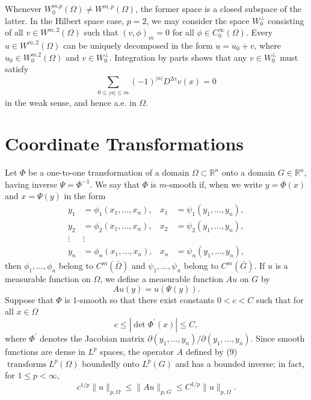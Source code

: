\begin{para}
  Whenever $W_0^{m . p}(\Omega) \neq W^{m, p}(\Omega)$, the former space is a closed subspace of the latter. In the Hilbert space case, $p=2$, we may consider the space $W_0^{\perp}$ consisting of all $v \in W^{m, 2}(\Omega)$ such that $(v, \phi)_m=0$ for all $\phi \in C_0^{\infty}(\Omega)$. Every $u \in W^{m, 2}(\Omega)$ can be uniquely decomposed in the form $u=u_0+v$, where $u_0 \in W_0^{m .2}(\Omega)$ and $v \in W_0^{\perp}$. Integration by parts shows that any $v \in W_0^{\perp}$ must satisfy
  \[
  \sum_{0 \leq|\alpha| \leq m}(-1)^{|\alpha|} D^{2 \alpha} v(x)=0
  \]
  in the weak sense, and hence a.e. in $\Omega$.
\end{para}


\section{Coordinate Transformations}

\begin{para}
  Let $\Phi$ be a one-to-one transformation of a domain $\Omega \subset \mathbb{R}^n$ onto a domain $G \in \mathbb{R}^n$, having inverse $\Psi=\Phi^{-1}$. We say that $\Phi$ is $m$-smooth if, when we write $y=\Phi(x)$ and $x=\Psi(y)$ in the form
  \[
  \begin{aligned}
  y_1 & =\phi_1\left(x_1, \ldots, x_n\right), & x_1 & =\psi_1\left(y_1, \ldots, y_n\right), \\
  y_2 & =\phi_2\left(x_1, \ldots, x_n\right), & x_2 & =\psi_2\left(y_1, \ldots, y_n\right), \\
  \vdots & \vdots & & \\
  y_n & =\phi_n\left(x_1, \ldots, x_n\right), & x_n & =\psi_n\left(y_1, \ldots, y_n\right),
  \end{aligned}
  \]
  then $\phi_1, \ldots, \phi_n$ belong to $C^m(\bar{\Omega})$ and $\psi_1, \ldots, \psi_n$ belong to $C^m(\bar{G})$.
  If $u$ is a measurable function on $\Omega$, we define a measurable function $A u$ on $G$ by
  \begin{equation}\label{eq:3.9}
    A u(y)=u(\Psi(y)) .
  \end{equation}
  Suppose that $\Phi$ is 1-smooth so that there exist constants $0<c<C$ such that for all $x \in \Omega$
  \begin{equation}\label{eq:3.10}
    c \leq\left|\operatorname{det} \Phi^{\prime}(x)\right| \leq C,
  \end{equation}
  where $\Phi^{\prime}$ denotes the Jacobian matrix $\partial\left(y_1, \ldots, y_n\right) / \partial\left(y_1, \ldots, y_n\right)$. Since smooth functions are dense in $L^p$ spaces, the operator $A$ defined by (9) $\operatorname{transforms} L^p(\Omega)$ boundedly onto $L^p(G)$ and has a bounded inverse; in fact, for $1 \leq p<\infty$,
  \[
  c^{1 / p}\|u\|_{p, \Omega} \leq\|A u\|_{p, G} \leq C^{1 / p}\|u\|_{p, \Omega} .
  \]
\end{para}


